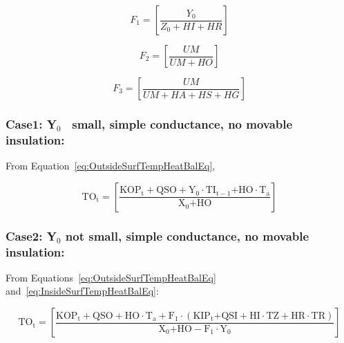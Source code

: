 \begin{equation}
{F_1} = \left[ {\frac{{{Y_0}}}{{{Z_0} + HI + HR}}} \right]
\end{equation}

\begin{equation}
{F_2} = \left[ {\frac{{UM}}{{UM + HO}}} \right]
\end{equation}

\begin{equation}
{F_3} = \left[ {\frac{{UM}}{{UM + HA + HS + HG}}} \right]
\end{equation}

\subsubsection{Case1: Y\(_{0}\)~ small, simple conductance, no movable insulation:}\label{case1-yux5f0-small-simple-conductance-no-movable-insulation}

From Equation~\ref{eq:OutsideSurfTempHeatBalEq},

\begin{equation}
{\mathrm{T}}{{\mathrm{O}}_{\mathrm{t}}}{\mathrm{ = }}\left[ {\frac{{{\mathrm{KO}}{{\mathrm{P}}_{\mathrm{t}}} + {\mathrm{QSO}} + {{\mathrm{Y}}_0}\cdot {\mathrm{T}}{{\mathrm{I}}_{{\mathrm{t - 1}}}}{\mathrm{ + HO}}\cdot {{\mathrm{T}}_{\mathrm{a}}}}}{{{{\mathrm{X}}_{\mathrm{0}}}{\mathrm{ + HO}}}}} \right]{\mathrm{  }}
\end{equation}

\subsubsection{Case2: Y\(_{0}\) not small, simple conductance, no movable insulation:}\label{case2-yux5f0-not-small-simple-conductance-no-movable-insulation}

From Equations~\ref{eq:OutsideSurfTempHeatBalEq} and~\ref{eq:InsideSurfTempHeatBalEq}:

\begin{equation}
{\mathrm{T}}{{\mathrm{O}}_{\mathrm{t}}}{\mathrm{ = }}\left[ {\frac{{{\mathrm{KO}}{{\mathrm{P}}_{\mathrm{t}}} + {\mathrm{QSO}} + {\mathrm{HO}}\cdot {{\mathrm{T}}_{\mathrm{a}}} + {{\mathrm{F}}_1}\cdot \left( {{\mathrm{KI}}{{\mathrm{P}}_{\mathrm{t}}}{\mathrm{ + QSI + HI}}\cdot {\mathrm{TZ + HR}}\cdot {\mathrm{TR}}} \right)}}{{{{\mathrm{X}}_{\mathrm{0}}}{\mathrm{ + HO - }}{{\mathrm{F}}_{\mathrm{1}}}\cdot {{\mathrm{Y}}_0}}}} \right]{\mathrm{  }}
\end{equation}

